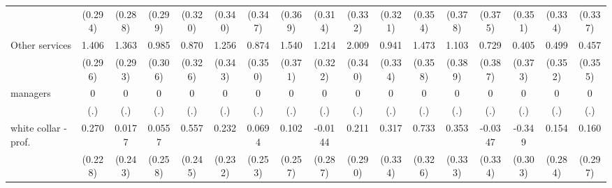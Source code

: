 {\begin{tabular}{l*{16}{c}}
                    &     (0.294)         &     (0.288)         &     (0.299)         &     (0.320)         &     (0.340)         &     (0.347)         &     (0.369)         &     (0.314)         &     (0.332)         &     (0.321)         &     (0.354)         &     (0.378)         &     (0.375)         &     (0.351)         &     (0.334)         &     (0.337)         \\
[1em]
Other services      &       1.406\sym{***}&       1.363\sym{***}&       0.985\sym{**} &       0.870\sym{**} &       1.256\sym{***}&       0.874\sym{*}  &       1.540\sym{***}&       1.214\sym{***}&       2.009\sym{***}&       0.941\sym{**} &       1.473\sym{***}&       1.103\sym{**} &       0.729         &       0.405         &       0.499         &       0.457         \\
                    &     (0.296)         &     (0.293)         &     (0.306)         &     (0.326)         &     (0.343)         &     (0.350)         &     (0.371)         &     (0.322)         &     (0.340)         &     (0.334)         &     (0.358)         &     (0.389)         &     (0.387)         &     (0.373)         &     (0.352)         &     (0.355)         \\
[1em]
managers            &           0         &           0         &           0         &           0         &           0         &           0         &           0         &           0         &           0         &           0         &           0         &           0         &           0         &           0         &           0         &           0         \\
                    &         (.)         &         (.)         &         (.)         &         (.)         &         (.)         &         (.)         &         (.)         &         (.)         &         (.)         &         (.)         &         (.)         &         (.)         &         (.)         &         (.)         &         (.)         &         (.)         \\
[1em]
white collar - prof.&       0.270         &      0.0177         &      0.0557         &       0.557\sym{*}  &       0.232         &      0.0694         &       0.102         &     -0.0144         &       0.211         &       0.317         &       0.733\sym{*}  &       0.353         &     -0.0347         &      -0.349         &       0.154         &       0.160         \\
                    &     (0.228)         &     (0.243)         &     (0.258)         &     (0.245)         &     (0.232)         &     (0.253)         &     (0.257)         &     (0.287)         &     (0.290)         &     (0.334)         &     (0.326)         &     (0.333)         &     (0.334)         &     (0.303)         &     (0.284)         &     (0.297)         \\

\end{tabular}}
